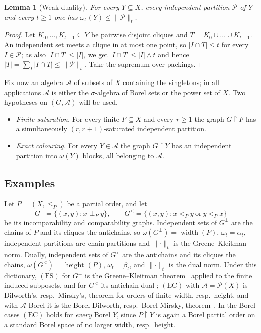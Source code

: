 \documentclass[11pt,reqno]{amsart}
\theoremstyle{plain}
\newtheorem{lemma}[theorem]{Lemma}
\theoremstyle{definition}
\theoremstyle{remark}
\newcommand{\restr}{\mathbin{\upharpoonright}}
\newcommand{\wdt}{\operatorname{width}}
\newcommand{\hgt}{\operatorname{height}}
\newcommand{\cl}{\omega}
\begin{document}
\begin{lemma}[Weak duality]
\label{lem:weak-duality}
For every $Y\subseteq X$, every independent partition $\mathcal P$ of $Y$ and
every $t\ge1$ one has $\cl_t(Y)\le\lVert\mathcal P\rVert_t$.
\end{lemma}

\begin{proof}
Let $K_0,\dots,K_{t-1}\subseteq Y$ be pairwise disjoint cliques and
$T=K_0\cup\dots\cup K_{t-1}$. An independent set meets a clique in at most one
point, so $|I\cap T|\le t$ for every $I\in\mathcal P$; as also
$|I\cap T|\le|I|$, we get $|I\cap T|\le|I|\wedge t$ and hence
$|T|=\sum_{I}|I\cap T|\le\lVert\mathcal P\rVert_t$. Take the supremum over
packings.
\end{proof}

Fix now an algebra $\mathcal A$ of subsets of $X$ containing the singletons; in
all applications $\mathcal A$ is either the $\sigma$-algebra of Borel sets or the
power set of $X$. Two hypotheses on $(G,\mathcal A)$ will be used.

\begin{itemize}
\item[$\mathrm{(FS)}$] \emph{Finite saturation.} For every finite
$F\subseteq X$ and every $r\ge1$ the graph $G\restr F$ has a simultaneously
$(r,r{+}1)$-saturated independent partition.
\item[$\mathrm{(EC)}$] \emph{Exact colouring.} For every $Y\in\mathcal A$ the
graph $G\restr Y$ has an independent partition into $\cl(Y)$ blocks, all
belonging to $\mathcal A$.
\end{itemize}

\subsection*{Examples}

Let $P=(X,\le_P)$ be a partial order, and let
\[
G^{\perp}=\{(x,y):x\perp_Py\},
\qquad
G^{<}=\{(x,y):x<_Py\ \text{or}\ y<_Px\}
\]
be its incomparability and comparability graphs. Independent sets of
$G^{\perp}$ are the chains of $P$ and its cliques the antichains, so
$\cl(G^{\perp})=\wdt(P)$, $\cl_t=\alpha_t$, independent partitions are chain
partitions and $\lVert\cdot\rVert_t$ is the Greene--Kleitman norm. Dually,
independent sets of $G^{<}$ are the antichains and its cliques the chains,
$\cl(G^{<})=\hgt(P)$, $\cl_t=\beta_t$, and $\lVert\cdot\rVert_t$ is the dual
norm. Under this dictionary, $\mathrm{(FS)}$ for $G^{\perp}$ is the
Greene--Kleitman theorem~\cite{GreeneKleitman1976} applied to the finite induced
subposets, and for $G^{<}$ its antichain dual
\cite[Theorem~3.1]{Greene1976}; $\mathrm{(EC)}$ with
$\mathcal A=\mathcal P(X)$ is Dilworth's, resp.\ Mirsky's, theorem for orders of
finite width, resp.\ height, and with $\mathcal A$ Borel it is the Borel
Dilworth, resp.\ Borel Mirsky, theorem~\cite{Kada1989,
CarroyMillerVidnyanszky2021}. In the Borel cases $\mathrm{(EC)}$ holds for
\emph{every} Borel $Y$, since $P\restr Y$ is again a Borel partial order on a
standard Borel space of no larger width, resp.\ height.
\end{document}
